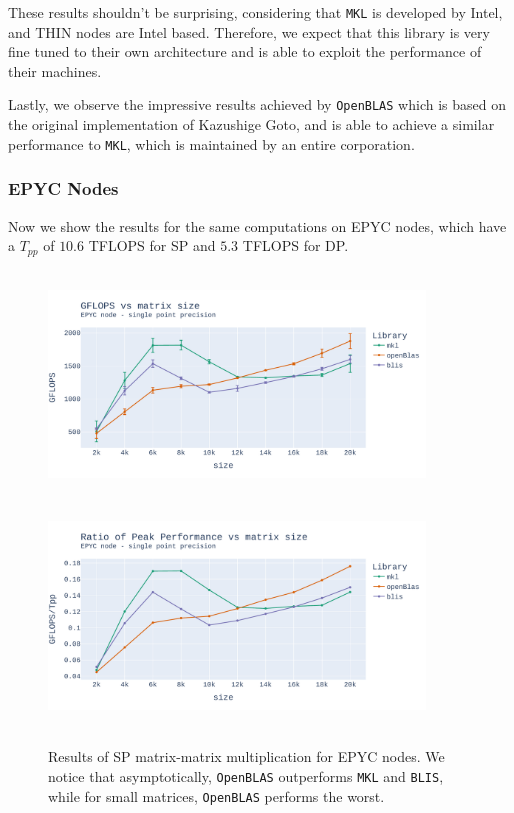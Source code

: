 \documentclass{report}
\begin{document}
These results shouldn't be surprising, considering 
that \texttt{MKL} is developed by Intel, and THIN nodes are Intel based.
Therefore, we expect that this library is very fine tuned to their own architecture 
and is able to exploit the performance of their machines.

Lastly, we observe the impressive results achieved by \texttt{OpenBLAS} which 
is based on the original implementation of Kazushige Goto, and is able to achieve a similar performance to 
\texttt{MKL}, which is maintained by an entire corporation.

\subsubsection{EPYC Nodes}

Now we show the results for the same computations on EPYC nodes, which have a 
$T_{pp}$ of $10.6$ TFLOPS for SP and $5.3$ TFLOPS for DP.

\begin{figure}[h!p]
\hspace*{-3.0cm}
\includegraphics[width=10cm, height=6cm]{./images/fixed_cores_epyc_float_gflops.pdf}
\includegraphics[width=10cm, height=6cm]{./images/fixed_cores_epyc_float_gflops_ratio.pdf}
\caption{\label{fig:fixed_cores_epyc_float} Results of SP matrix-matrix multiplication 
for EPYC nodes. We notice that asymptotically, \texttt{OpenBLAS} outperforms 
\texttt{MKL} and \texttt{BLIS}, while for small matrices, \texttt{OpenBLAS} 
performs the worst.}
\end{figure} 
\end{document}
